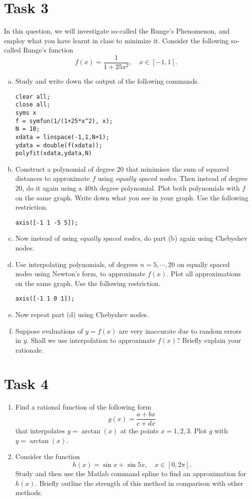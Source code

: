 \section*{Task 3}
In this question, we will investigate so-called the Runge's Phenomenon, and employ what you have learnt in class to minimize it.
Consider the following so-called Runge's function
\[ f(x)=\frac{1}{1+25x^2},\quad x\in[-1,1]. \]
\begin{enumerate}[(a)]
	\item Study and write down the output of the following commands.
	\begin{lstlisting}[style=Matlab-editor]
clear all;
close all;
syms x
f = symfun(1/(1+25*x^2), x);
N = 10;
xdata = linspace(-1,1,N+1);
ydata = double(f(xdata));
polyfit(xdata,ydata,N)
	\end{lstlisting}
	\item Construct a polynomial of degree 20 that minimises the sum of squared distances to approximate \(f\) using \emph{equally spaced nodes}.
	Then instead of degree 20, do it again using a 40th degree polynomial.
	Plot both polynomials with \(f\) on the same graph.
	Write down what you see in your graph.
	Use the following restriction.
	\begin{lstlisting}[style=Matlab-editor]
axis([-1 1 -5 5]);
	\end{lstlisting}
	\item Now instead of using \emph{equally spaced nodes}, do part (b) again using Chebyshev nodes.
	\item Use interpolating polynomials, of degrees \(n = 5, \cdots, 20\) on equally spaced nodes using Newton's form, to approximate \(f(x)\).
	Plot all approximations on the same graph.
	Use the following restriction.
	\begin{lstlisting}[style=Matlab-editor]
axis([-1 1 0 1]);
	\end{lstlisting}
	\item Now repeat part (d) using Chebyshev nodes.
	\item Suppose evaluations of \(y = f(x)\) are very inaccurate due to random errors in \(y\).
	Shall we use interpolation to approximate \(f(x)\)?
	Briefly explain your rationale.
\end{enumerate}


\section*{Task 4}
\begin{enumerate}
	\item Find a rational function of the following form
	\[ g(x)=\frac{a+bx}{c+dx} \]
	that interpolates \(y = \arctan(x)\) at the points \(x = 1, 2, 3\).
	Plot \(g\) with \(y = \arctan(x)\).
	\item Consider the function
	\[ h(x)=\sin x+\sin 5x, \quad x\in[0,2\pi]. \]
	Study and then use the Matlab command spline to find an approximation for \(h(x)\).
	Briefly outline the strength of this method in comparison with other methods.
\end{enumerate}